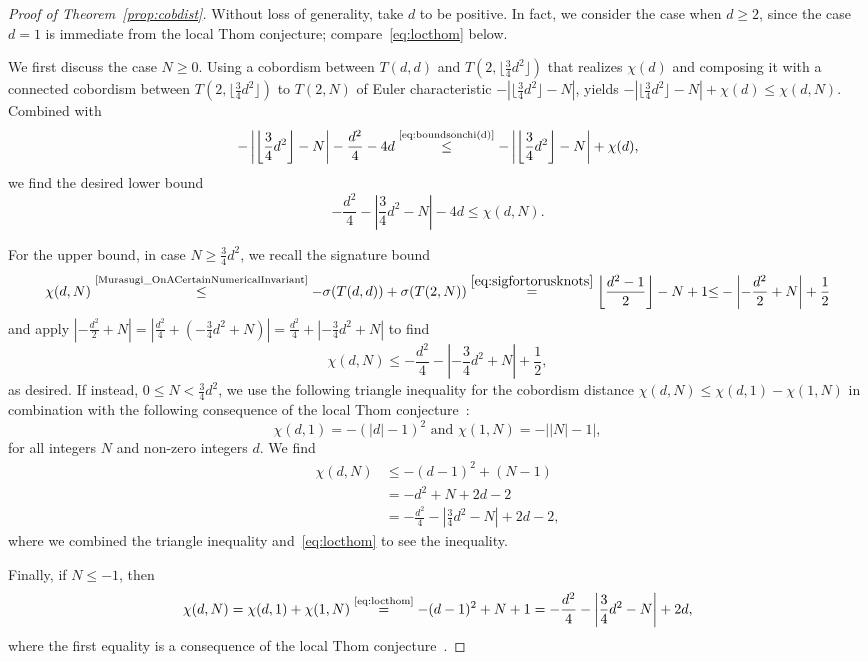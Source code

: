 \documentclass[10pt,a4paper]{article}
\theoremstyle{definition}
\numberwithin{equation}{section}
\begin{document}
\begin{proof}[Proof of Theorem~\ref{prop:cobdist}]
Without loss of generality, take $d$ to be positive. In fact, we consider the case when $d\geq 2$, since the case $d=1$ is immediate from the local Thom conjecture; compare~\eqref{eq:locthom} below.

We first discuss the case $N\geq0$. Using a cobordism between $T(d,d)$ and $T(2,\lfloor \frac{3}{4}d^2\rfloor)$ that realizes $\chi(d)$ and composing it with a connected cobordism between $T(2,\lfloor \frac{3}{4}d^2\rfloor)$ to $T(2,N)$ of Euler characteristic $-|\lfloor \frac{3}{4}d^2\rfloor-N|$, yields $-|\lfloor \frac{3}{4}d^2\rfloor-N|+\chi(d)\leq\chi(d,N)$. Combined with
\[
-\left|\left\lfloor \frac{3}{4}d^2\right\rfloor-N\right|-\frac{d^2}{4}-4d
\overset{\text{\eqref{eq:boundsonchi(d)}}}{\leq}-\left|\left\lfloor \frac{3}{4}d^2\right\rfloor-N\right|+\chi(d),
\]
we find the desired lower bound
\[
-\frac{d^2}{4}-\left|\frac{3}{4}d^2-N\right|-4d
\leq\chi(d,N).
\]

For the upper bound, in case $N\geq \frac{3}{4}d^2$, we recall the signature bound
\[
\chi(d,N)\overset{\text{\cite{Murasugi_OnACertainNumericalInvariant}}}{\leq} -\sigma(T(d,d))+\sigma(T(2,N))\overset{\eqref{eq:sigfortorusknots}}{=} \left\lfloor\frac{d^2-1}{2}\right\rfloor-N+1{\leq} -\left|-\frac{d^2}{2}+N\right|+\frac{1}{2}
\]
and apply $|-\frac{d^2}{2}+N|=|\frac{d^2}{4}+(-\frac{3}{4}d^2+N)|= \frac{d^2}{4}+|-\frac{3}{4}d^2+N|$ to find
\[
\chi(d,N)\leq -\frac{d^2}{4}-\left|-\frac{3}{4}d^2+N\right|+\frac{1}{2},
\]
as desired. If instead, $0\leq N< \frac{3}{4}d^2$, we use the following triangle inequality for the cobordism distance $\chi(d,N)\leq \chi(d,1) - \chi(1,N)$ in combination with the following consequence of the local Thom conjecture~\cite[Corollary~1.3]{KronheimerMrowka_Gaugetheoryforemb}:
\begin{equation}\label{eq:locthom}
\chi(d,1)=-(|d|-1)^2\text{ and } \chi(1,N)=-\left||N|-1\right|,
\end{equation}
for all integers $N$ and non-zero integers $d$. We find
\begin{align*}
\chi(d,N)&\leq-(d-1)^2+(N-1)
\\&= -d^2+N+2d-2
\\&=-\frac{d^2}{4}-\left|\frac{3}{4}d^2-N\right|+2d-2,
\end{align*}
where we combined the triangle inequality and~\eqref{eq:locthom} to see the inequality.

Finally, if $N\leq -1$, then
\[
\chi(d,N)= \chi(d,1)+\chi(1,N)\overset{\text{\eqref{eq:locthom}}}{=}-(d-1)^2+N+1 =-\frac{d^2}{4}-\left|\frac{3}{4}d^2-N\right|+2d,
\]
where the first equality is a consequence of the local Thom conjecture~\cite[Corollary~1.3]{KronheimerMrowka_Gaugetheoryforemb}.
\end{proof}
\end{document}
